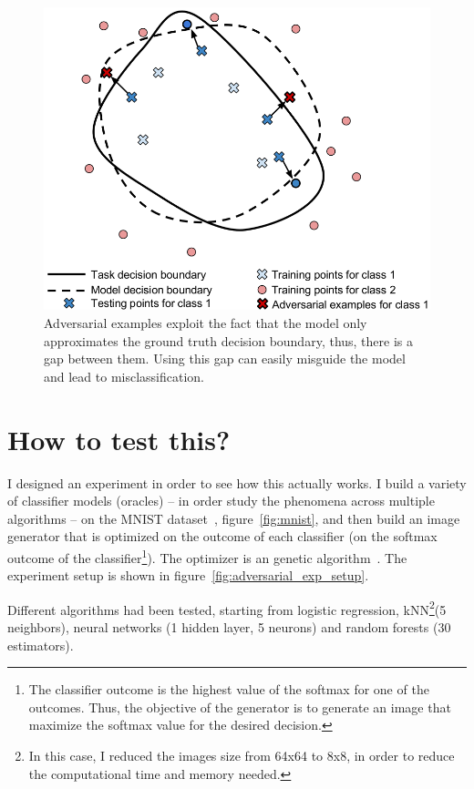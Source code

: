   \begin{figure}
    \centering
    \includegraphics[scale=0.3]{images/adv_attack/gen_er4.png}
    \caption{Adversarial examples exploit the fact that the model only approximates the ground truth decision boundary, thus, there is a gap between them. Using this gap can easily misguide the model and lead to misclassification.}
    \label{fig:gen_er4}
  \end{figure}

\section{How to test this?}
  \par I designed an experiment in order to see how this actually works. I build a variety of classifier models (oracles) -- in order study the phenomena across multiple algorithms -- on the MNIST dataset~\citep{lecun-mnisthandwrittendigit-2010}, figure~\ref{fig:mnist}, and then build an image generator that is optimized on the outcome of each classifier (on the softmax outcome of the classifier\footnote{The classifier outcome is the highest value of the softmax for one of the outcomes. Thus, the objective of the generator is to generate an image that maximize the softmax value for the desired decision.}). The optimizer is an genetic algorithm~\citep{eiben2003introduction}. The experiment setup is shown in figure~\ref{fig:adversarial_exp_setup}.

  Different algorithms had been tested, starting from logistic regression, kNN\footnote{In this case, I reduced the images size from 64x64 to 8x8, in order to reduce the computational time and memory needed.}(5 neighbors), neural networks (1 hidden layer, 5 neurons) and random forests (30 estimators).

